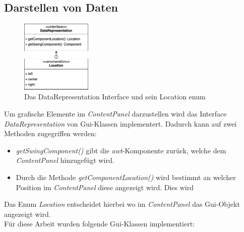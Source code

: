 \subsection{Darstellen von Daten}
\begin{figure}
  \vspace{-15pt}
  \includegraphics[width=0.3\textwidth,]{fig/GUI_DataRepresentation.png}
  \vspace{-15pt}
  \caption{Das DataRepresentation Interface und sein Location enum}
  \label{fig:DataRepresentation}
  \vspace{-30pt}
\end{figure}
Um grafische Elemente im \textit{ContentPanel} darzustellen wird das Interface \textit{DataRepresentation}
von Gui-Klassen implementert. Dadurch kann auf zwei Methoden zugegriffen werden:
\begin{itemize}
  \item \textit{getSwingComponent()} gibt die \textit{awt}-Komponente zurück, welche dem \textit{ContentPanel}
    hinzugefügt wird.
\item Durch die Methode \textit{getComponentLocation()} wird bestimmt an welcher
  Position im \textit{ContentPanel} diese angezeigt wird. Dies wird 
\end{itemize}




Das Enum \textit{Location} entscheidet hierbei wo im \textit{ContentPanel} das Gui-Objekt
angezeigt wird.\\

Für diese Arbeit wurden folgende Gui-Klassen implementiert:


\newpage
